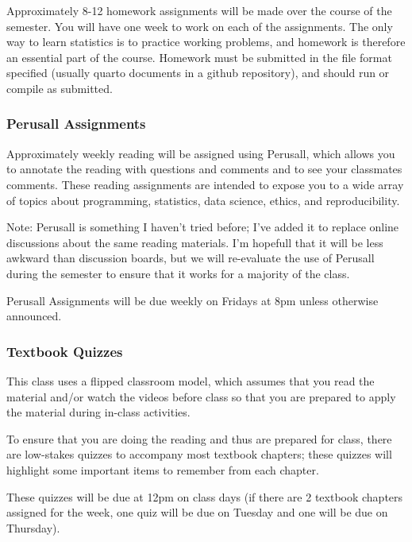 \documentclass[
  11pt,
  letterpaper,
  DIV=11,
  numbers=noendperiod]{scrartcl}
\begin{document}
Approximately 8-12 homework assignments will be made over the course of
the semester. You will have one week to work on each of the assignments.
The only way to learn statistics is to practice working problems, and
homework is therefore an essential part of the course. Homework must be
submitted in the file format specified (usually quarto documents in a
github repository), and should run or compile as submitted.

\hypertarget{perusall-assignments}{%
\subsubsection{Perusall Assignments}\label{perusall-assignments}}

Approximately weekly reading will be assigned using Perusall, which
allows you to annotate the reading with questions and comments and to
see your classmates comments. These reading assignments are intended to
expose you to a wide array of topics about programming, statistics, data
science, ethics, and reproducibility.

Note: Perusall is something I haven't tried before; I've added it to
replace online discussions about the same reading materials. I'm
hopefull that it will be less awkward than discussion boards, but we
will re-evaluate the use of Perusall during the semester to ensure that
it works for a majority of the class.

Perusall Assignments will be due weekly on Fridays at 8pm unless
otherwise announced.

\hypertarget{textbook-quizzes}{%
\subsubsection{Textbook Quizzes}\label{textbook-quizzes}}

This class uses a flipped classroom model, which assumes that you read
the material and/or watch the videos before class so that you are
prepared to apply the material during in-class activities.

To ensure that you are doing the reading and thus are prepared for
class, there are low-stakes quizzes to accompany most textbook chapters;
these quizzes will highlight some important items to remember from each
chapter.

These quizzes will be due at 12pm on class days (if there are 2 textbook
chapters assigned for the week, one quiz will be due on Tuesday and one
will be due on Thursday).
\end{document}
